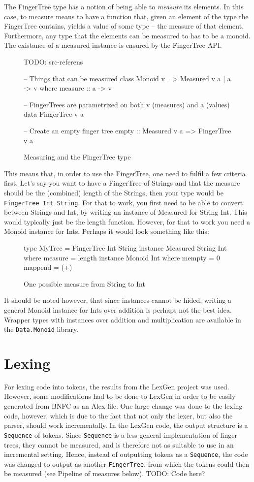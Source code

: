 \documentclass[a4paper,12pt,twosided]{report}
\begin{document}
The FingerTree type has a notion of being able to \textit{measure} its elements.
In this case, to measure means to have a function that, given an element of the
type the FingerTree contains, yields a value of some type -- the measure of that
element. Furthermore, any type that the elements can be measured to has to be a
monoid. The existance of a measured instance is ensured by the FingerTree API. 
\begin{figure}[H]
TODO: src-referens
\begin{code}
-- Things that can be measured
class Monoid v => Measured v a | a -> v where
    measure :: a -> v

-- FingerTrees are parametrized on both v (measures) and a (values)
data FingerTree v a

-- Create an empty finger tree
empty :: Measured v a => FingerTree v a
\end{code}
\caption{Measuring and the FingerTree type}
\end{figure}
This means that, in order to use the FingerTree, one need to fulfil a few
criteria first. Let's say you want to have a FingerTree of Strings and that the
measure should be the (combined) length of the Strings, then your type would be
\texttt{FingerTree Int String}. For that to work, you first need to be able to
convert between Strings and Int, by writing an instance of Measured for String
Int. This would typically just be the length function. However, for that to work
you need a Monoid instance for Ints. Perhaps it would look something like this:

\begin{figure}[H]
\begin{code}
type MyTree = FingerTree Int String
instance Measured String Int where
    measure = length
instance Monoid Int where
    mempty = 0
    mappend = (+)
\end{code}
\caption{One possible measure from String to Int}
\end{figure}
It should be noted however, that since instances cannot be hided, writing a
general Monoid instance for Ints over addition is perhaps not the best idea.
Wrapper types with instances over addition and multiplication are available in
the \texttt{Data.Monoid} library.

\section{Lexing}
For lexing code into tokens, the results from the LexGen project was used.
However, some modifications had to be done to LexGen in order to be easily
generated from BNFC as an Alex file. One large change was done to the lexing
code, however, which is due to the fact that not only the lexer, but also the
parser, should work incrementally. In the LexGen code, the output structure is a
\texttt{Sequence} of tokens. Since \texttt{Sequence} is a less general
implementation of finger trees, they cannot be measured, and is therefore not as
suitable to use in an incremental setting. Hence, instead of outputting tokens
as a \texttt{Sequence}, the code was changed to output as another
\texttt{FingerTree}, from which the tokens could then be measured (see Pipeline
of measures below).
TODO: Code here?
\end{document}

